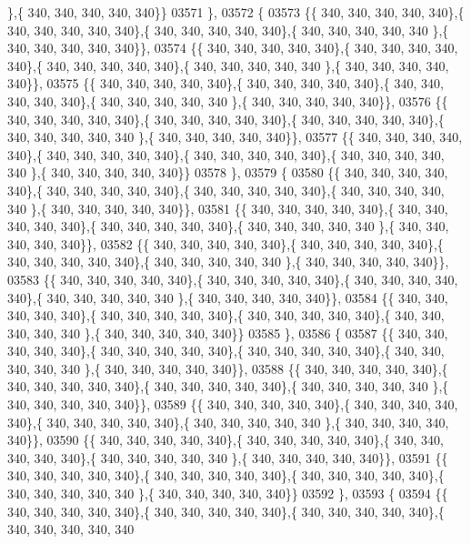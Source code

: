 \begin{DoxyCode}
      \},\{ 340, 340, 340, 340, 340\}\}
03571 \},
03572 \{
03573 \{\{ 340, 340, 340, 340, 340\},\{ 340, 340, 340, 340, 340\},\{ 340, 340, 340, 340, 340\},\{ 340, 340, 340, 340, 340
      \},\{ 340, 340, 340, 340, 340\}\},
03574 \{\{ 340, 340, 340, 340, 340\},\{ 340, 340, 340, 340, 340\},\{ 340, 340, 340, 340, 340\},\{ 340, 340, 340, 340, 340
      \},\{ 340, 340, 340, 340, 340\}\},
03575 \{\{ 340, 340, 340, 340, 340\},\{ 340, 340, 340, 340, 340\},\{ 340, 340, 340, 340, 340\},\{ 340, 340, 340, 340, 340
      \},\{ 340, 340, 340, 340, 340\}\},
03576 \{\{ 340, 340, 340, 340, 340\},\{ 340, 340, 340, 340, 340\},\{ 340, 340, 340, 340, 340\},\{ 340, 340, 340, 340, 340
      \},\{ 340, 340, 340, 340, 340\}\},
03577 \{\{ 340, 340, 340, 340, 340\},\{ 340, 340, 340, 340, 340\},\{ 340, 340, 340, 340, 340\},\{ 340, 340, 340, 340, 340
      \},\{ 340, 340, 340, 340, 340\}\}
03578 \},
03579 \{
03580 \{\{ 340, 340, 340, 340, 340\},\{ 340, 340, 340, 340, 340\},\{ 340, 340, 340, 340, 340\},\{ 340, 340, 340, 340, 340
      \},\{ 340, 340, 340, 340, 340\}\},
03581 \{\{ 340, 340, 340, 340, 340\},\{ 340, 340, 340, 340, 340\},\{ 340, 340, 340, 340, 340\},\{ 340, 340, 340, 340, 340
      \},\{ 340, 340, 340, 340, 340\}\},
03582 \{\{ 340, 340, 340, 340, 340\},\{ 340, 340, 340, 340, 340\},\{ 340, 340, 340, 340, 340\},\{ 340, 340, 340, 340, 340
      \},\{ 340, 340, 340, 340, 340\}\},
03583 \{\{ 340, 340, 340, 340, 340\},\{ 340, 340, 340, 340, 340\},\{ 340, 340, 340, 340, 340\},\{ 340, 340, 340, 340, 340
      \},\{ 340, 340, 340, 340, 340\}\},
03584 \{\{ 340, 340, 340, 340, 340\},\{ 340, 340, 340, 340, 340\},\{ 340, 340, 340, 340, 340\},\{ 340, 340, 340, 340, 340
      \},\{ 340, 340, 340, 340, 340\}\}
03585 \},
03586 \{
03587 \{\{ 340, 340, 340, 340, 340\},\{ 340, 340, 340, 340, 340\},\{ 340, 340, 340, 340, 340\},\{ 340, 340, 340, 340, 340
      \},\{ 340, 340, 340, 340, 340\}\},
03588 \{\{ 340, 340, 340, 340, 340\},\{ 340, 340, 340, 340, 340\},\{ 340, 340, 340, 340, 340\},\{ 340, 340, 340, 340, 340
      \},\{ 340, 340, 340, 340, 340\}\},
03589 \{\{ 340, 340, 340, 340, 340\},\{ 340, 340, 340, 340, 340\},\{ 340, 340, 340, 340, 340\},\{ 340, 340, 340, 340, 340
      \},\{ 340, 340, 340, 340, 340\}\},
03590 \{\{ 340, 340, 340, 340, 340\},\{ 340, 340, 340, 340, 340\},\{ 340, 340, 340, 340, 340\},\{ 340, 340, 340, 340, 340
      \},\{ 340, 340, 340, 340, 340\}\},
03591 \{\{ 340, 340, 340, 340, 340\},\{ 340, 340, 340, 340, 340\},\{ 340, 340, 340, 340, 340\},\{ 340, 340, 340, 340, 340
      \},\{ 340, 340, 340, 340, 340\}\}
03592 \},
03593 \{
03594 \{\{ 340, 340, 340, 340, 340\},\{ 340, 340, 340, 340, 340\},\{ 340, 340, 340, 340, 340\},\{ 340, 340, 340, 340, 340

\end{DoxyCode}
